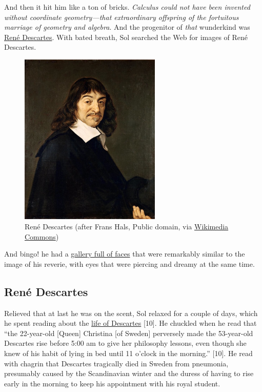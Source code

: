 \documentclass[
  12pt,
  british,
  a4paper,
]{article}
\makeatletter
\newcounter{figno}
\newenvironment{fignos:no-prefix-figure-caption}{
      \caption@ifcompatibility{}{
        \let\oldthefigure\thefigure
        \let\oldtheHfigure\theHfigure
        \renewcommand{\thefigure}{figno:\thefigno}
        \renewcommand{\theHfigure}{figno:\thefigno}
        \stepcounter{figno}
        \captionsetup{labelformat=empty}
      }
    }{
      \caption@ifcompatibility{}{
        \captionsetup{labelformat=default}
        \let\thefigure\oldthefigure
        \let\theHfigure\oldtheHfigure
        \addtocounter{figure}{-1}
      }
    }
\makeatother
\begin{document}
And then it hit him like a ton of bricks. \emph{Calculus could not have
been invented without coordinate geometry---that extraordinary offspring
of the fortuitous marriage of geometry and algebra}. And the progenitor
of \emph{that} wunderkind was
\href{https://en.wikipedia.org/wiki/Ren\%C3\%A9_Descartes}{René
Descartes}. With bated breath, Sol searched the Web for images of René
Descartes.

\begin{fignos:no-prefix-figure-caption}

\begin{figure}
\centering
\includegraphics[width=0.6\textwidth,height=\textheight]{images/rene-descartes.jpg}
\caption{René Descartes (after Frans Hals, Public domain, via
\href{https://commons.wikimedia.org/wiki/File:Frans_Hals_-_Portret_van_Ren\%C3\%A9_Descartes.jpg}{Wikimedia
Commons})}
\end{figure}

\end{fignos:no-prefix-figure-caption}

And bingo! he had a \href{https://tinyurl.com/y57nykjd}{gallery full of
faces} that were remarkably similar to the image of his reverie, with
eyes that were piercing and dreamy at the same time.

\hypertarget{renuxe9-descartes}{%
\subsection{René Descartes}\label{renuxe9-descartes}}

Relieved that at last he was on the scent, Sol relaxed for a couple of
days, which he spent reading about the
\href{https://www.britannica.com/biography/Rene-Descartes}{life of
Descartes} {[}10{]}. He chuckled when he read that ``the 22-year-old
{[}Queen{]} Christina {[}of Sweden{]} perversely made the 53-year-old
Descartes rise before 5:00 am to give her philosophy lessons, even
though she knew of his habit of lying in bed until 11 o'clock in the
morning.'' {[}10{]}. He read with chagrin that Descartes tragically died
in Sweden from pneumonia, presumably caused by the Scandinavian winter
and the duress of having to rise early in the morning to keep his
appointment with his royal student.
\end{document}
